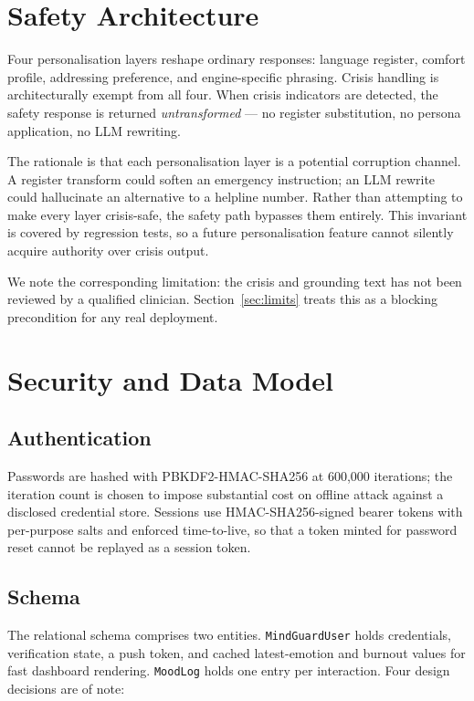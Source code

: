 \documentclass[conference]{IEEEtran}
\begin{document}
\section{Safety Architecture}
\label{sec:safety}

Four personalisation layers reshape ordinary responses: language register,
comfort profile, addressing preference, and engine-specific phrasing. Crisis
handling is architecturally exempt from all four. When crisis indicators are
detected, the safety response is returned \emph{untransformed} --- no
register substitution, no persona application, no LLM rewriting.

The rationale is that each personalisation layer is a potential corruption
channel. A register transform could soften an emergency instruction; an LLM
rewrite could hallucinate an alternative to a helpline number. Rather than
attempting to make every layer crisis-safe, the safety path bypasses them
entirely. This invariant is covered by regression tests, so a future
personalisation feature cannot silently acquire authority over crisis output.

We note the corresponding limitation: the crisis and grounding text has not
been reviewed by a qualified clinician. Section~\ref{sec:limits} treats this
as a blocking precondition for any real deployment.

\section{Security and Data Model}

\subsection{Authentication}
Passwords are hashed with PBKDF2-HMAC-SHA256 \cite{pbkdf2} at 600{,}000
iterations; the iteration count is chosen to impose substantial cost on
offline attack against a disclosed credential store. Sessions use
HMAC-SHA256-signed bearer tokens with per-purpose salts and enforced
time-to-live, so that a token minted for password reset cannot be replayed as
a session token.

\subsection{Schema}
The relational schema comprises two entities. \texttt{MindGuardUser} holds
credentials, verification state, a push token, and cached latest-emotion and
burnout values for fast dashboard rendering. \texttt{MoodLog} holds one entry
per interaction. Four design decisions are of note:
\end{document}
